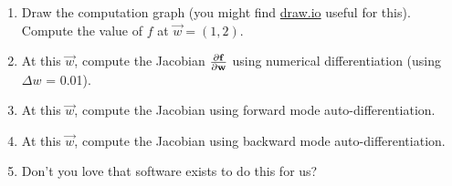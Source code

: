 \begin{enumerate}
\item Draw the computation graph (you might find \href{https://draw.io/}{draw.io} useful for this). Compute the value of $f$ at $\vec{w} = (1, 2)$.
\item At this $\vec{w}$, compute the Jacobian $\frac{\partial \mathbf{f}} {\partial \mathbf{w}}$ using numerical differentiation (using $\Delta w$ = 0.01).
\item At this $\vec{w}$, compute the Jacobian using forward mode auto-differentiation.
\item At this $\vec{w}$, compute the Jacobian using backward mode auto-differentiation.
\item Don't you love that software exists to do this for us?
\end{enumerate}